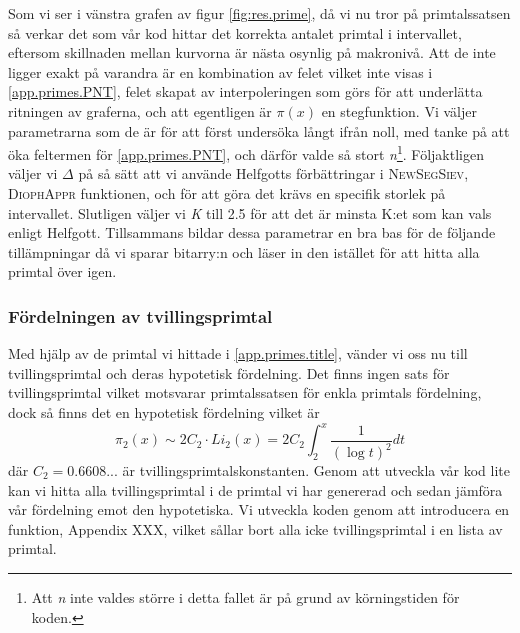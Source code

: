 
Som vi ser i vänstra grafen av figur \ref{fig:res.prime}, då vi nu tror på primtalssatsen så verkar det som vår kod hittar det korrekta antalet primtal i intervallet, eftersom skillnaden mellan kurvorna är nästa osynlig på makronivå. 
Att de inte ligger exakt på varandra är en kombination av felet vilket inte visas i \eqref{app.primes.PNT}, felet skapat av interpoleringen som görs för att underlätta ritningen av graferna, och att egentligen är \(\pi(x)\) en stegfunktion. 
Vi väljer parametrarna som de är för att först undersöka långt ifrån noll, med tanke på att öka feltermen för \eqref{app.primes.PNT}, och därför valde så stort \textit{n}\footnote{Att \textit{n} inte valdes större i detta fallet är på grund av körningstiden för koden.}.
Följaktligen väljer vi \(\Delta\) på så sätt att vi använde Helfgotts förbättringar i \textsc{NewSegSiev}, \textsc{DiophAppr} funktionen, och för att göra det krävs en specifik storlek på intervallet.
Slutligen väljer vi \textit{K} till 2.5 för att det är minsta K:et som kan vals enligt Helfgott.
Tillsammans bildar dessa parametrar en bra bas för de följande tillämpningar då vi sparar bitarry:n och läser in den istället för att hitta alla primtal över igen.

\subsubsection{Fördelningen av tvillingsprimtal}

Med hjälp av de primtal vi hittade i \ref{app.primes.title}, vänder vi oss nu till tvillingsprimtal och deras hypotetisk fördelning. Det finns ingen sats för tvillingsprimtal vilket motsvarar primtalssatsen för enkla primtals fördelning, dock så finns det en hypotetisk fördelning vilket är
\begin{equation}
    \pi_2(x) \sim 2C_2\cdot Li_2(x) = 2C_2\int_2^x\frac{1}{(\log t)^2}dt\label{app.twins.TWN}
\end{equation}
där \(C_2 = 0.6608...\) är tvillingsprimtalskonstanten. Genom att utveckla vår kod lite kan vi hitta alla tvillingsprimtal i de primtal vi har genererad och sedan jämföra vår fördelning emot den hypotetiska. Vi utveckla koden genom att introducera en funktion, Appendix XXX, vilket sållar bort alla icke tvillingsprimtal i en lista av primtal.

